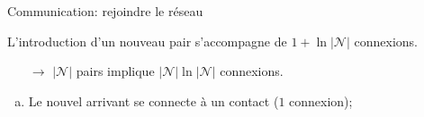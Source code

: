 \begin{frame}{Communication}{\SPRAY : rejoindre le réseau}

  L'introduction d'un nouveau pair s'accompagne de $1+ \ln {|\mathcal{N}|}$
  connexions.%
  \begin{itemize}
  \item [$\rightarrow$] $|\mathcal{N}|$ pairs implique
    $|\mathcal{N}|\ln |\mathcal{N}|$ connexions.
  \end{itemize}


  \vspace{0.5cm}

  \begin{minipage}{0.6\textwidth}
    \begin{enumerate}[(a)]
    \item Le nouvel arrivant se connecte à un contact ($1$ connexion);
    \end{enumerate}
  \end{minipage}
  \hfill
  \begin{minipage}{0.35\textwidth}
    \begin{center}
      
    \end{center}
  \end{minipage}
  
  \vspace{1cm}
  
  \large
  \begin{itemize}
  \end{itemize}

\end{frame}


